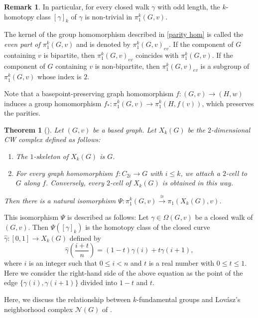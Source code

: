 \documentclass[11pt, amsfonts]{amsart}
\numberwithin{equation}{section}
\newtheorem{theorem}[thm]{Theorem}
\theoremstyle{definition}
\newtheorem{remark}[thm]{Remark}
\theoremstyle{remark}
\newcommand{\N}{\mathcal{N}}
\begin{document}
\begin{remark} \label{remark parity}
In particular, for every closed walk $\gamma$ with odd length, the $k$-homotopy class $[\gamma]_k$ of $\gamma$ is non-trivial in $\pi_1^k(G,v)$.
\end{remark}

The kernel of the group homomorphism described in \eqref{parity hom} is called the \emph{even part of $\pi_1^k(G,v)$} and is denoted by $\pi_1^k(G,v)_{ev}$. If the component of $G$ containing $v$ is bipartite, then $\pi_1^k(G,v)_{ev}$ coincides with $\pi_1^k(G,v)$. If the component of $G$ containing $v$ is non-bipartite, then $\pi_1^k(G,v)_{ev}$ is a subgroup of $\pi_1^k(G,v)$ whose index is $2$.

Note that a basepoint-preserving graph homomorphism $f \colon (G,v) \to (H,w)$ induces a group homomorphism $f_* \colon \pi_1^k(G,v) \to \pi_1^k(H,f(v))$, which preserves the parities.

\begin{theorem}[{\cite[Theorem~3.2]{MatsushitaJMSUT}}] \label{theorem X_k}
Let $(G,v)$ be a based graph. Let $X_k(G)$ be the $2$-dimensional CW complex defined as follows:
\begin{enumerate}[(1)]
\item The $1$-skeleton of $X_k(G)$ is $G$.

\item For every graph homomorphism $f \colon C_{2i} \to G$ with $i \le k$, we attach a $2$-cell to $G$ along $f$. Conversely, every $2$-cell of $X_k(G)$ is obtained in this way.
\end{enumerate}
Then there is a natural isomorphism $\Psi \colon \pi_1^k(G,v) \xrightarrow{\cong} \pi_1(X_k(G), v)$.
\end{theorem}

This isomorphism $\Psi$ is described as follows: Let $\gamma \in \Omega(G,v)$ be a closed walk of $(G,v)$. Then $\Psi([\gamma]_k)$ is the homotopy class of the closed curve $\hat{\gamma} \colon [0,1] \to X_k(G)$ defined by
\[ \hat{\gamma} \left( \frac{i + t}{n} \right) = (1-t)\gamma(i) + t \gamma(i+1),\]
where $i$ is an integer such that $0 \le i < n$ and $t$ is a real number with $0 \le t \le 1$.
Here we consider the right-hand side of the above equation as the point of the edge $\{ \gamma(i), \gamma(i+1)\}$ divided into $1-t$ and $t$.

Here, we discuss the relationship between $k$-fundamental groups and Lov\'asz's neighborhood complex $\N(G)$ of \cite{Lovasz}.
\end{document}
